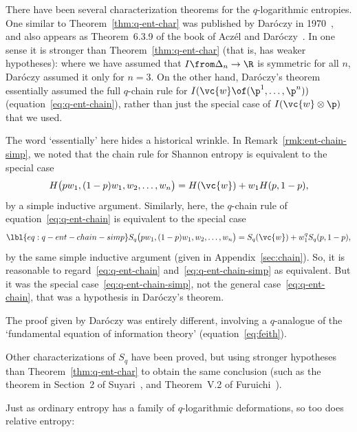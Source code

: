 \begin{remark}
% 
There have been several characterization theorems for the $q$-logarithmic
entropies.  One similar to Theorem~\ref{thm:q-ent-char} was published
by Dar\'oczy%
%
% 
in 1970~\cite{DaroGIF}, and also appears as Theorem~6.3.9 of the book of
Acz\'el and Dar\'oczy~\cite{AcDa}.  In one sense it is stronger than
Theorem~\ref{thm:q-ent-char} (that is, has weaker hypotheses): where we
have assumed that $I \from \Delta_n \to \R$ is symmetric for all $n$,
Dar\'oczy assumed it only for $n = 3$.  On the other hand, Dar\'oczy's
theorem essentially assumed the full $q$-chain rule for $I(\vc{w} \of
(\p^1, \ldots, \p^n))$ (equation~\eqref{eq:q-ent-chain}), rather than just
the special case of $I(\vc{w} \otimes \p)$ that we used.

The word `essentially' here hides a historical wrinkle.  In
Remark~\ref{rmk:ent-chain-simp}, we noted that the chain rule for Shannon
entropy is equivalent to the special case
\[
H\bigl(pw_1, (1 - p)w_1, w_2, \ldots, w_n\bigr)
=
H(\vc{w}) + w_1 H(p, 1 - p),
\]
by a simple inductive argument.  Similarly, here, the $q$-chain rule of
equation~\eqref{eq:q-ent-chain} is equivalent to the special case
% 
\begin{equation}
\lbl{eq:q-ent-chain-simp}
S_q\bigl(pw_1, (1 - p)w_1, w_2, \ldots, w_n\bigr)
=
S_q(\vc{w}) + w_1^q S_q(p, 1 - p),
\end{equation}
% 
by the same simple inductive argument (given in Appendix~\ref{sec:chain}).
So, it is reasonable to regard~\eqref{eq:q-ent-chain}
and~\eqref{eq:q-ent-chain-simp} as equivalent.  But it was the special
case~\eqref{eq:q-ent-chain-simp}, not the general
case~\eqref{eq:q-ent-chain}, that was a hypothesis in Dar\'oczy's theorem.

The proof given by Dar\'oczy was entirely different, involving a
$q$-analogue of the `fundamental%
% 
% 
equation of information theory' (equation~\eqref{eq:feith}).

Other characterizations of $S_q$ have been proved, but using stronger
hypotheses than Theorem~\ref{thm:q-ent-char} to obtain the same conclusion
(such as the theorem in Section~2 of Suyari~\cite{Suya}, and Theorem~V.2
of Furuichi~\cite{Furu}).
\end{remark}

Just as ordinary entropy has a family of $q$-logarithmic deformations, so
too does relative entropy:

